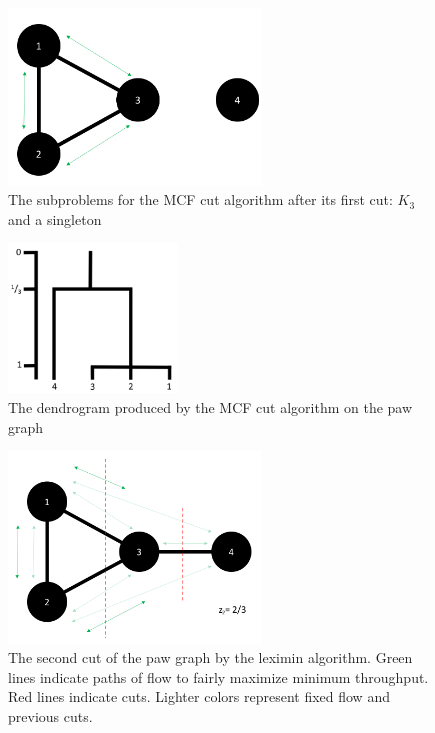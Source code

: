 \begin{figure}
\centering
\includegraphics[width=0.6\textwidth]{fig/MCF_level2}
\caption{The subproblems for the MCF cut algorithm after its first cut: $K_3$ and a singleton}
\label{fig:MCF_level2}
\end{figure}

\begin{figure}
\centering
\includegraphics[width=0.4\textwidth]{fig/dendrogram_4_tie}
\caption{The dendrogram produced by the MCF cut algorithm on the paw graph}
\label{fig:MCF_dendrogram}
\end{figure}

\begin{figure}
\centering
\includegraphics[width=0.6\textwidth]{fig/level2}
\caption{The second cut of the paw graph by the leximin algorithm. Green lines indicate paths of flow to fairly maximize minimum throughput. Red lines indicate cuts. Lighter colors represent fixed flow and previous cuts.}
\label{fig:level2}
\end{figure}

